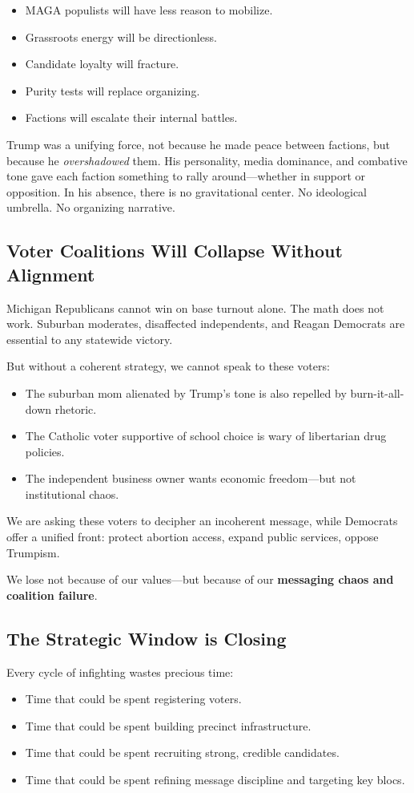 \begin{itemize}
\item MAGA populists will have less reason to mobilize.
\item Grassroots energy will be directionless.
\item Candidate loyalty will fracture.
\item Purity tests will replace organizing.
\item Factions will escalate their internal battles.
\end{itemize}

Trump was a unifying force, not because he made peace between factions, but because he \textit{overshadowed} them. His personality, media dominance, and combative tone gave each faction something to rally around—whether in support or opposition. In his absence, there is no gravitational center. No ideological umbrella. No organizing narrative.

\subsection{Voter Coalitions Will Collapse Without Alignment}
Michigan Republicans cannot win on base turnout alone. The math does not work. Suburban moderates, disaffected independents, and Reagan Democrats are essential to any statewide victory.

But without a coherent strategy, we cannot speak to these voters:
\begin{itemize}
\item The suburban mom alienated by Trump’s tone is also repelled by burn-it-all-down rhetoric.
\item The Catholic voter supportive of school choice is wary of libertarian drug policies.
\item The independent business owner wants economic freedom—but not institutional chaos.
\end{itemize}

We are asking these voters to decipher an incoherent message, while Democrats offer a unified front: protect abortion access, expand public services, oppose Trumpism.

We lose not because of our values—but because of our \textbf{messaging chaos and coalition failure}.

\subsection{The Strategic Window is Closing}
Every cycle of infighting wastes precious time:
\begin{itemize}
\item Time that could be spent registering voters.
\item Time that could be spent building precinct infrastructure.
\item Time that could be spent recruiting strong, credible candidates.
\item Time that could be spent refining message discipline and targeting key blocs.
\end{itemize}

